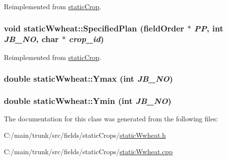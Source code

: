 Reimplemented from \hyperlink{classstatic_crop_ab7763e4e6a0b9eff1788cb86ebad8170}{staticCrop}.\hypertarget{classstatic_wwheat_adad91fcc0de2a252030e17e25fdc97e4}{
\subsubsection[{SpecifiedPlan}]{\setlength{\rightskip}{0pt plus 5cm}void staticWwheat::SpecifiedPlan ({\bf fieldOrder} $\ast$ {\em PP}, \/  int {\em JB\_\-NO}, \/  char $\ast$ {\em crop\_\-id})}}
\label{classstatic_wwheat_adad91fcc0de2a252030e17e25fdc97e4}


Reimplemented from \hyperlink{classstatic_crop_af19d8a1e4f4833325f6712c22ede8b45}{staticCrop}.\hypertarget{classstatic_wwheat_a76fa2c4a59fa9a7918345d3e4194aba7}{
\subsubsection[{Ymax}]{\setlength{\rightskip}{0pt plus 5cm}double staticWwheat::Ymax (int {\em JB\_\-NO})}}
\label{classstatic_wwheat_a76fa2c4a59fa9a7918345d3e4194aba7}
\hypertarget{classstatic_wwheat_a97b208e29e9f0ba0dcc3b940503449a2}{
\subsubsection[{Ymin}]{\setlength{\rightskip}{0pt plus 5cm}double staticWwheat::Ymin (int {\em JB\_\-NO})}}
\label{classstatic_wwheat_a97b208e29e9f0ba0dcc3b940503449a2}


The documentation for this class was generated from the following files:\begin{DoxyCompactItemize}
\item 
C:/main/trunk/src/fields/staticCrops/\hyperlink{static_wwheat_8h}{staticWwheat.h}\item 
C:/main/trunk/src/fields/staticCrops/\hyperlink{static_wwheat_8cpp}{staticWwheat.cpp}\end{DoxyCompactItemize}
